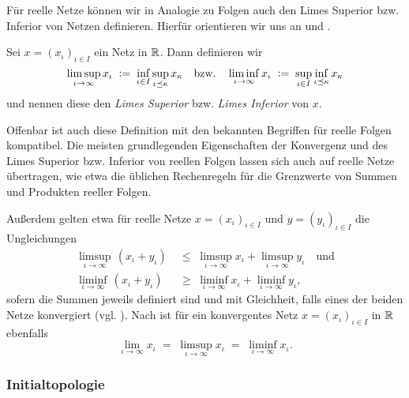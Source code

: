 \documentclass[../main/main.tex]{subfiles}
\begin{document}
	Für reelle Netze können wir in Analogie zu Folgen auch den Limes Superior bzw. Inferior von Netzen definieren. Hierfür orientieren wir uns an
	\cite[Kapitel 2.1 und Aufgabe 2.55]{Megginson.1998} und \cite[Kapitel 2.4]{Aliprantis.2006}.
	
	\begin{Definition}
		Sei $x = (x_\iota)_{\iota \in I}$ ein Netz in $\mathbb{R}$. Dann definieren wir 
		\[ \limsup_{\iota \to \infty} x_\iota \; \vcentcolon = \; \inf_{\iota \in I} \sup_{\iota \preceq \kappa} x_\kappa \quad \text{bzw.} \quad 
		\liminf_{\iota \to \infty} x_\iota \; \vcentcolon = \; \sup_{\iota \in I} \inf_{\iota \preceq \kappa} x_\kappa \]
		und nennen diese den \emph{Limes Superior} bzw. \emph{Limes Inferior} von $x$.
	\end{Definition}
	
	\begin{Bemerkung}
		Offenbar ist auch diese Definition mit den bekannten Begriffen für reelle Folgen kompatibel. Die meisten grundlegenden Eigenschaften der Konvergenz und des 
		Limes Superior bzw. Inferior von reellen Folgen lassen sich auch auf reelle Netze übertragen, 
		wie etwa die üblichen Rechenregeln für die Grenzwerte von Summen und Produkten reeller Folgen.
		
		Außerdem gelten etwa für reelle Netze $x = (x_\iota)_{\iota \in I}$ und
		$y = (y_\iota)_{\iota \in I}$ die Ungleichungen
		\begin{align*}
			\limsup_{\iota \to \infty} \, (x_\iota + y_\iota) \; &\leq \; \limsup_{\iota \to \infty} x_\iota + \limsup_{\iota \to \infty} y_\iota \quad \text{und}\\
			\liminf_{\iota \to \infty} \, (x_\iota + y_\iota) \; &\geq \; \liminf_{\iota \to \infty} x_\iota + \liminf_{\iota \to \infty} y_\iota \text{,}
		\end{align*}
		sofern die Summen jeweils definiert sind und
		mit Gleichheit, falls eines der beiden Netze konvergiert (vgl. \cite[Aufgabe 2.55 (e)]{Megginson.1998}).
		Nach \cite[Aufgabe 2.55 (i)]{Megginson.1998} ist für ein konvergentes Netz $x = (x_\iota)_{\iota \in I}$ in $\mathbb{R}$ ebenfalls
		\[ \lim_{\iota \to \infty} x_\iota \; = \; \limsup_{\iota \to \infty} x_\iota \; = \; \liminf_{\iota \to \infty} x_\iota \text{.} \]
	\end{Bemerkung}
	
	\subsubsection*{Initialtopologie}
	
\end{document}
